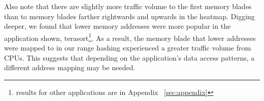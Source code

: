 Also note that there are slightly more traffic volume to the first memory blades than to memory blades farther rightwards and upwards in the heatmap. Digging deeper, we found that lower memory addresses were more popular in the application shown, terasort\footnote{results for other applications are in Appendix ~\ref{sec:appendix}}. As a result, the memory blade that lower addresses were mapped to in our range hashing experienced a greater traffic volume from CPUs. This suggests that depending on the application's data access patterns, a different address mapping may be needed.

